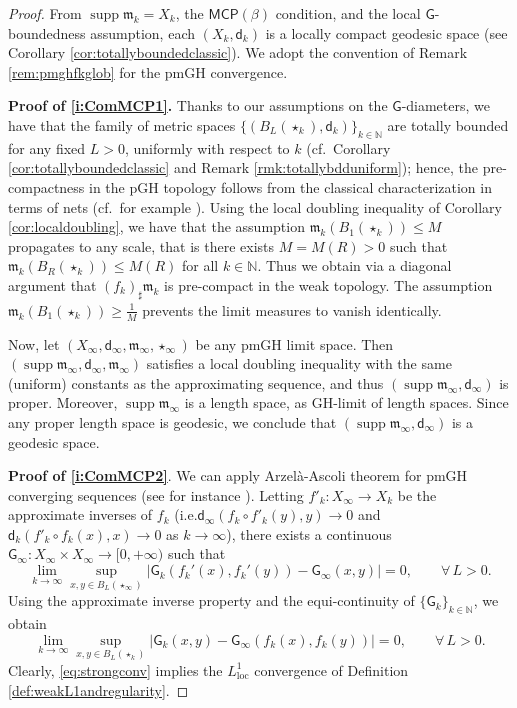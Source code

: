 \documentclass[11pt,a4paper]{article}
\theoremstyle{plain}
\theoremstyle{definition}
\theoremstyle{remark}
\numberwithin{equation}{section}
\newcommand{\N}{\mathbb{N}} %
\DeclareMathOperator{\supp}{\mathrm{supp}}
\newcommand{\MCP}{\mathsf{MCP}}
\newcommand{\loc}{\mathrm{loc}}
\newcommand{\mm}{\mathfrak m}
\newcommand{\sfd}{\mathsf d}
\newcommand{\sfG}{\mathsf G}
\begin{document}
\begin{proof}
From $\supp\mm_k=X_k$, the $\MCP(\beta)$ condition, and the local $\sfG$-boundedness assumption, each $(X_k,\sfd_k)$ is a locally compact geodesic space (see Corollary \ref{cor:totallyboundedclassic}).  We adopt the convention of Remark \ref{rem:pmghfkglob} for the pmGH convergence. 

\textbf{Proof of \ref{i:ComMCP1}.} Thanks to our assumptions on the $\sfG$-diameters, we have that the family of metric spaces $\{(B_L(\star_k),\sfd_k)\}_{k\in\N}$ are totally bounded for any fixed $L>0$, uniformly with respect to $k$ (cf.\ Corollary \ref{cor:totallyboundedclassic} and Remark \ref{rmk:totallybdduniform}); hence, the pre-compactness in the pGH topology follows from the classical characterization in terms of nets (cf.\ for example \cite[Thm.\@ 27.10, Def.\ 27.13]{Vil}). Using the local doubling inequality of Corollary \ref{cor:localdoubling}, we have that the assumption $\mm_k(B_1(\star_k))\leq M$ propagates to any scale, that is there exists $M = M(R)>0$ such that $\mm_k(B_R(\star_k))\leq M(R)$ for all $k\in \N$. Thus we obtain via a diagonal argument that $(f_k)_\sharp\mm_k$ is pre-compact in the weak topology.  The assumption $ \mm_k(B_1(\star_k))\geq \tfrac{1}{M}$ prevents the  limit measures to vanish identically.

Now, let  $(X_\infty,\sfd_\infty,\mm_\infty,\star_\infty)$ be any pmGH limit space. Then $(\supp\mm_\infty, \sfd_\infty, \mm_\infty)$ satisfies a local doubling inequality with the same (uniform) constants as the approximating sequence, and thus $(\supp\mm_\infty,\sfd_\infty)$ is proper. Moreover, $\supp\mm_\infty$ is a length space, as GH-limit of length spaces. Since any proper length space is geodesic, we conclude that $(\supp\mm_\infty, \sfd_\infty)$ is a geodesic space.

\textbf{Proof of \ref{i:ComMCP2}}. We can apply Arzelà-Ascoli theorem for pmGH converging sequences (see for instance \cite[Prop.\@ 27.20]{Vil}). Letting $f'_k : X_\infty \to X_k$ be the approximate inverses of $f_k$ (i.e.\@ $\sfd_\infty(f_k\circ f'_k(y),y) \to 0$ and $\sfd_k(f'_k\circ f_k(x),x) \to 0$ as $k\to \infty$), there exists a continuous $\sfG_\infty : X_\infty \times X_\infty \to [0,+\infty)$ such that
\begin{equation}
\lim_{k\to \infty}\sup_{x,y\in B_L(\star_\infty)}|\sfG_k(f_k'(x),f_k'(y))-\sfG_\infty(x,y)| =0, \qquad \forall\, L>0.
\end{equation}
Using the approximate inverse property and the equi-continuity of $\{\sfG_k\}_{k\in\N}$, we obtain
\begin{equation}\label{eq:strongconv}
\lim_{k\to\infty}\sup_{x,y \in B_L(\star_k)} |\sfG_k(x,y)-\sfG_\infty(f_k(x),f_k(y))| =0, \qquad \forall\, L >0.
\end{equation}
Clearly,  \eqref{eq:strongconv} implies the $L^1_\loc$ convergence of Definition \ref{def:weakL1andregularity}.


\end{proof}
\end{document}
